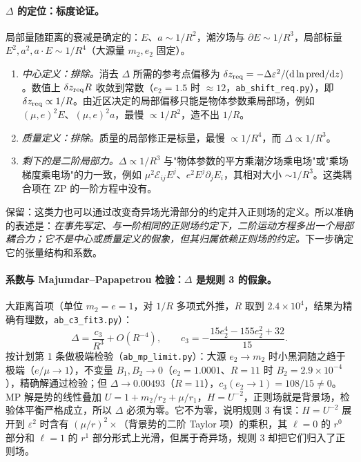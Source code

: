 \documentclass[11pt,a4paper]{ctexart}
\numberwithin{equation}{section}
\newcommand{\dd}{\mathrm d}
\begin{document}
\paragraph{$\Delta$ 的定位：标度论证。}局部量随距离的衰减是确定的：$E$、$a\sim1/R^2$，潮汐场与 $\partial E\sim1/R^3$，局部标量 $E^2,a^2,a\cdot E\sim1/R^4$（大源量 $m_2,e_2$ 固定）。
\begin{enumerate}
\item \emph{中心定义：排除。}消去 $\Delta$ 所需的参考点偏移为 $\delta z_{\rm req}=-\Delta\varepsilon^2/(\dd\ln{\rm pred}/\dd z)$。数值上 $\delta z_{\rm req}R$ 收敛到常数（$e_2=1.5$ 时 $\approx12$，\texttt{ab\_shift\_req.py}），即 $\delta z_{\rm req}\propto1/R$。由近区决定的局部偏移只能是物体参数乘局部场，例如 $(\mu,e)^2E$、$(\mu,e)^2a$，最慢 $\propto1/R^2$，造不出 $1/R$。
\item \emph{质量定义：排除。}质量的局部修正是标量，最慢 $\propto1/R^4$，而 $\Delta\propto1/R^3$。
\item \emph{剩下的是二阶局部力。}$\Delta\propto1/R^3$ 与"物体参数的平方乘潮汐场乘电场"或"乘场梯度乘电场"的力一致，例如 $\mu^2\mathcal E_{ij}E^j$、$e^2E^j\partial_jE_i$，其相对大小 $\sim1/R^3$。这类耦合项在 ZP 的一阶方程中没有。
\end{enumerate}
保留：这类力也可以通过改变奇异场光滑部分的约定并入正则场的定义。所以准确的表述是：\emph{在事先写定、与一阶相同的正则场约定下，二阶运动方程多出一个局部耦合力；它不是中心或质量定义的假象，但其归属依赖正则场的约定。}下一步确定它的张量结构和系数。

\paragraph{系数与 Majumdar--Papapetrou 检验：$\Delta$ 是规则 3 的假象。}大距离首项（单位 $m_2=e=1$，对 $1/R$ 多项式外推，$R$ 取到 $2.4\times10^4$，结果为精确有理数，\texttt{ab\_c3\_fit3.py}）：
\begin{equation*}
\Delta=\frac{c_3}{R^3}+O(R^{-4}),\qquad c_3=-\frac{15e_2^4-155e_2^2+32}{15}.
\end{equation*}
按计划第 1 条做极端检验（\texttt{ab\_mp\_limit.py}）：大源 $e_2\to m_2$ 时小黑洞随之趋于极端（$e/\mu\to1$），不变量 $B_1,B_2\to0$（$e_2=1.0001$、$R=11$ 时 $B_2=2.9\times10^{-4}$），精确解通过检验；但 $\Delta\to0.00493$（$R=11$），$c_3(e_2\to1)=108/15\ne0$。MP 解是势的线性叠加 $U=1+m_2/r_2+\mu/r_1$，$H=U^{-2}$，正则场就是背景场，检验体平衡严格成立，所以 $\Delta$ 必须为零。它不为零，说明规则 3 有误：$H=U^{-2}$ 展开到 $\varepsilon^2$ 时含有 $(\mu/r)^2\times$（背景势的二阶 Taylor 项）的乘积，其 $\ell=0$ 的 $r^0$ 部分和 $\ell=1$ 的 $r^1$ 部分形式上光滑，但属于奇异场，规则 3 却把它们归入了正则场。
\end{document}
